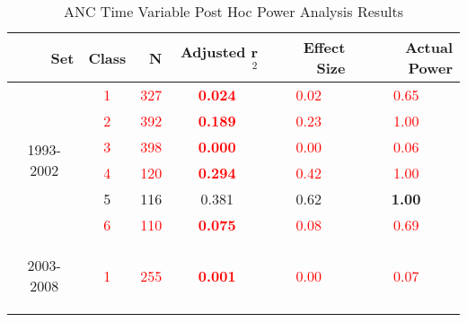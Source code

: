 \begin{table}\tiny
  \centering
	  \caption{ANC Time Variable Post Hoc Power Analysis Results}
    \begin{tabular}{rrrrrr}
    \toprule
    Set   & Class & N     & Adjusted r$^2$ & \multicolumn{1}{p{.5cm}}{Effect Size} & Actual Power \\
    \midrule
    \multicolumn{1}{c}{\multirow{6}[1]{*}{\begin{sideways}1993-2002\end{sideways}}} & \multicolumn{1}{c}{\textcolor{red}{1}} & \multicolumn{1}{c}{\textcolor{red}{327}} & \multicolumn{1}{c}{\textcolor{red}{\textbf{0.024}}} & \multicolumn{1}{c}{\textcolor{red}{0.02}} & \multicolumn{1}{c}{\textcolor{red}{0.65}} \\
    \multicolumn{1}{c}{} & \multicolumn{1}{c}{\textcolor{red}{2}} & \multicolumn{1}{c}{\textcolor{red}{392}} & \multicolumn{1}{c}{\textcolor{red}{\textbf{0.189}}} & \multicolumn{1}{c}{\textcolor{red}{0.23}} & \multicolumn{1}{c}{\textcolor{red}{1.00}} \\
    \multicolumn{1}{c}{} & \multicolumn{1}{c}{\textcolor{red}{3}} & \multicolumn{1}{c}{\textcolor{red}{398}} & \multicolumn{1}{c}{\textcolor{red}{\textbf{0.000}}} & \multicolumn{1}{c}{\textcolor{red}{0.00}} & \multicolumn{1}{c}{\textcolor{red}{0.06}} \\
    \multicolumn{1}{c}{} & \multicolumn{1}{c}{\textcolor{red}{4}} & \multicolumn{1}{c}{\textcolor{red}{120}} & \multicolumn{1}{c}{\textcolor{red}{\textbf{0.294}}} & \multicolumn{1}{c}{\textcolor{red}{0.42}} & \multicolumn{1}{c}{\textcolor{red}{1.00}} \\
    \multicolumn{1}{c}{} & \multicolumn{1}{c}{5} & \multicolumn{1}{c}{116} & \multicolumn{1}{c}{0.381 } & \multicolumn{1}{c}{0.62 } & \multicolumn{1}{c}{\textbf{1.00}} \\
    \multicolumn{1}{c}{} & \multicolumn{1}{c}{\textcolor{red}{6}} & \multicolumn{1}{c}{\textcolor{red}{110}} & \multicolumn{1}{c}{\textcolor{red}{\textbf{0.075}}} & \multicolumn{1}{c}{\textcolor{red}{0.08}} & \multicolumn{1}{c}{\textcolor{red}{0.69}} \\\midrule
    \multicolumn{1}{c}{\multirow{6}[2]{*}{\begin{sideways}2003-2008\end{sideways}}} & \multicolumn{1}{c}{\textcolor{red}{1}} & \multicolumn{1}{c}{\textcolor{red}{255}} & \multicolumn{1}{c}{\textcolor{red}{\textbf{0.001}}} & \multicolumn{1}{c}{\textcolor{red}{0.00}} & \multicolumn{1}{c}{\textcolor{red}{0.07}} \\

\end{tabular}
\end{table}

